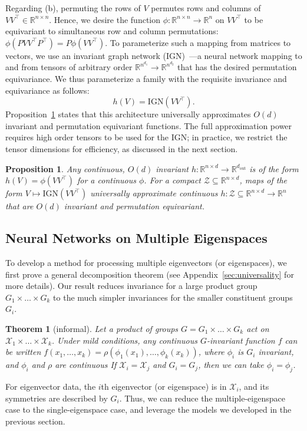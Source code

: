 \documentclass{article} \usepackage{iclr2023_conference,times}
\newcommand{\RR}{\mathbb R}
\newcommand{\mc}[1]{\mathcal{#1}}
\newcommand{\mrm}[1]{\mathrm{#1}}
\newcommand{\dout}{d_{\mrm{out}}}
\newtheorem{theorem}{Theorem}
\newtheorem{proposition}{Proposition}
\begin{document}
Regarding (b), permuting the rows of $V$ permutes rows and columns of $VV^\top \in \RR^{n \times n}$. Hence, we desire the function  $\phi: \RR^{n \times n} \to \RR^n$ on $VV^\top$ to be equivariant to simultaneous row and column permutations: $\phi(PVV^\top P^\top) = P\phi(VV^\top)$.
To parameterize such a mapping from matrices to vectors, we use an invariant graph network ($\mrm{IGN}$)~\citep{maron2018invariant}---a neural network mapping to and from tensors of arbitrary order $\RR^{n^{d_1}} \to \RR^{n^{d_2}}$ that has the desired permutation equivariance.  We thus parameterize a family with the requisite invariance and equivariance as follows:
\begin{equation}
h(V) = \mrm{IGN}(V V^\top).
\end{equation}
Proposition~\ref{prop:ign_universal} states that this architecture universally approximates $O(d)$ invariant and permutation equivariant functions. The full approximation power requires high order tensors to be used for the $\mrm{IGN}$; in practice, we restrict the tensor dimensions for efficiency, as discussed in the next section.

\begin{proposition}\label{prop:ign_universal}
    Any continuous, $O(d)$ invariant $h: \RR^{n \times d} \to \RR^{\dout}$ is of the form $h(V) = \phi(VV^\top)$ for a continuous $\phi$. For a compact $\mc Z \subseteq \RR^{n \times d}$, maps of the form $V \mapsto \mrm{IGN}(VV^\top)$ universally approximate continuous  $h: \mc Z \subseteq \RR^{n \times d} \to \RR^n$ that are $O(d)$ invariant and permutation equivariant.
\end{proposition}


\subsection{Neural Networks on Multiple Eigenspaces}\label{sec: multiple spaces}

To develop a method for processing multiple eigenvectors (or eigenspaces), we first prove a general decomposition theorem (see Appendix~\ref{sec:universality} for more details). Our result reduces invariance for a large product group $G_1 \times \ldots \times G_k$ to the much simpler invariances for the smaller constituent groups $G_i$.

\begin{theorem}[informal]
Let a product of groups $G = G_1 \times \ldots \times G_k$ act on $\mc X_1 \times \ldots \times \mc X_k$. Under mild conditions, any continuous $G$-invariant function $f$ can be written $f(x_1, \ldots, x_k) = \rho(\phi_1(x_1), \ldots, \phi_k(x_k))$, where $\phi_i$ is $G_i$ invariant, and $\phi_i$ and $\rho$ are continuous If $\mc X_i = \mc X_j$ and $G_i = G_j$, then we can take $\phi_i = \phi_j$.
\end{theorem}
For eigenvector data, the $i$th eigenvector (or eigenspace) is in $\mc X_i$, and its symmetries are described by $G_i$. Thus, we can reduce the multiple-eigenspace case to the single-eigenspace case, and leverage the models we developed in the previous section.
\end{document}
